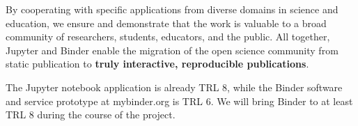 By cooperating with specific applications from diverse domains in science and education,
we ensure and demonstrate that the work is valuable to a broad community of researchers, students, educators, and the public.
All together, Jupyter and Binder enable the migration of the open
science community from static publication to \textbf{truly interactive,
reproducible publications}.

The Jupyter notebook application is already TRL 8,
while the Binder software and service prototype at mybinder.org is TRL 6.
We will bring Binder to at least TRL 8 during the course of the project.



